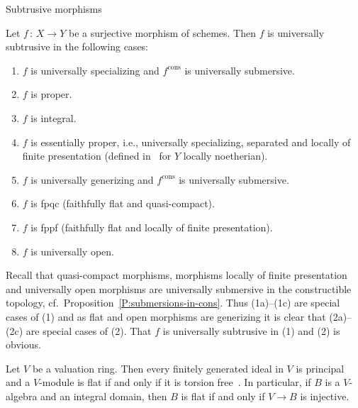 \documentclass[a4paper,twoside,11pt]{amsart}[2009/07/02] %
\newcommand{\pref}[1]{\eqref{#1}}
\newcommand{\map}[3]{#1\,:\, #2\rightarrow #3}
\newcommand{\cons}{\mathrm{cons}} %
\begin{document}
\begin{section}{Subtrusive morphisms}
\begin{remark}\label{R:subtrusive-examples}
Let $\map{f}{X}{Y}$ be a surjective morphism of schemes. Then $f$ is
universally subtrusive in the following cases:
%
\begin{enumerate}
\item[(1)] $f$ is universally specializing and $f^{\cons}$ is universally
submersive.
\item[(1a)] $f$ is proper.
\item[(1b)] $f$ is integral.
\item[(1c)] $f$ is essentially proper, i.e., universally specializing, separated
and locally of finite presentation (defined in~\cite[Rem.~18.10.20]{egaIV} for
$Y$ locally noetherian).
\item[(2)] $f$ is universally generizing and $f^{\cons}$ is universally
submersive.
\item[(2a)] $f$ is fpqc (faithfully flat and quasi-compact).
\item[(2b)] $f$ is fppf (faithfully flat and locally of finite presentation).
\item[(2c)] $f$ is universally open.
\end{enumerate}
%
Recall that quasi-compact morphisms, morphisms locally of finite presentation
and universally open morphisms are universally submersive in the constructible
topology, cf.~Proposition~\pref{P:submersions-in-cons}. Thus (1a)--(1c) are
special cases of (1) and as flat and open morphisms are generizing it is clear
that (2a)--(2c) are special cases of (2). That $f$ is universally subtrusive in
(1) and (2) is obvious.
\end{remark}

\begin{remark}\label{R:val-rings-and-flatness}
Let $V$ be a valuation ring. Then every finitely generated ideal in $V$ is
principal and a $V$-module is flat if and only if it is torsion
free~\cite[Ch.~VI, \S3, No.~6, Lem.~1]{bourbaki_alg_comm_5_6}.
%
In particular, if $B$ is a $V$-algebra and an integral domain, then $B$ is flat
if and only if $V\to B$ is injective.
\end{remark}


\end{section}
\end{document}
